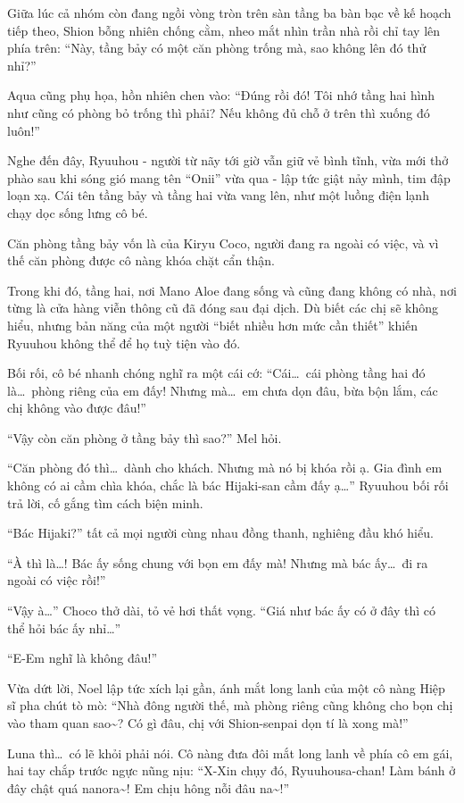 \documentclass[../main.tex]{subfiles}
\begin{document}
Giữa lúc cả nhóm còn đang ngồi vòng tròn trên sàn tầng ba bàn bạc về kế hoạch tiếp theo, Shion bỗng nhiên chống cằm, nheo mắt nhìn trần nhà rồi chỉ tay lên phía trên: ``Này, tầng bảy có một căn phòng trống mà, sao không lên đó thử nhỉ?''

Aqua cũng phụ họa, hồn nhiên chen vào: ``Đúng rồi đó! Tôi nhớ tầng hai hình như cũng có phòng bỏ trống thì phải? Nếu không đủ chỗ ở trên thì xuống đó luôn!''

Nghe đến đây, Ryuuhou - người từ nãy tới giờ vẫn giữ vẻ bình tĩnh, vừa mới thở phào sau khi sóng gió mang tên ``Onii'' vừa qua - lập tức giật nảy mình, tim đập loạn xạ. Cái tên tầng bảy và tầng hai vừa vang lên, như một luồng điện lạnh chạy dọc sống lưng cô bé.

Căn phòng tầng bảy vốn là của Kiryu Coco, người đang ra ngoài có việc, và vì thế căn phòng được cô nàng khóa chặt cẩn thận.

Trong khi đó, tầng hai, nơi Mano Aloe đang sống và cũng đang không có nhà, nơi từng là cửa hàng viễn thông cũ đã đóng sau đại dịch. Dù biết các chị sẽ không hiểu, nhưng bản năng của một người ``biết nhiều hơn mức cần thiết'' khiến Ryuuhou không thể để họ tuỳ tiện vào đó.

Bối rối, cô bé nhanh chóng nghĩ ra một cái cớ: ``Cái\dots\ cái phòng tầng hai đó là\dots\ phòng riêng của em đấy! Nhưng mà\dots\ em chưa dọn đâu, bừa bộn lắm, các chị không vào được đâu!''

``Vậy còn căn phòng ở tầng bảy thì sao?'' Mel hỏi.

``Căn phòng đó thì\dots\ dành cho khách. Nhưng mà nó bị khóa rồi ạ. Gia đình em không có ai cầm chìa khóa, chắc là bác Hijaki-san cầm đấy ạ\dots'' Ryuuhou bối rối trả lời, cố gắng tìm cách biện minh.

``Bác Hijaki?'' tất cả mọi người cùng nhau đồng thanh, nghiêng đầu khó hiểu.

``À thì là\dots! Bác ấy sống chung với bọn em đấy mà! Nhưng mà bác ấy\dots\ đi ra ngoài có việc rồi!''

``Vậy à\dots'' Choco thở dài, tỏ vẻ hơi thất vọng. ``Giá như bác ấy có ở đây thì có thể hỏi bác ấy nhỉ\dots''

``E-Em nghĩ là không đâu!''

Vừa dứt lời, Noel lập tức xích lại gần, ánh mắt long lanh của một cô nàng Hiệp sĩ pha chút tò mò: ``Nhà đông người thế, mà phòng riêng cũng không cho bọn chị vào tham quan sao\~{}? Có gì đâu, chị với Shion-senpai dọn tí là xong mà!''

Luna thì\dots\ có lẽ khỏi phải nói. Cô nàng đưa đôi mắt long lanh về phía cô em gái, hai tay chắp trước ngực nũng nịu: ``X-Xin chụy đó, Ryuuhousa-chan! Làm bánh ở đây chật quá nanora\~{}! Em chịu hông nỗi đâu na\~{}!''
\end{document}
